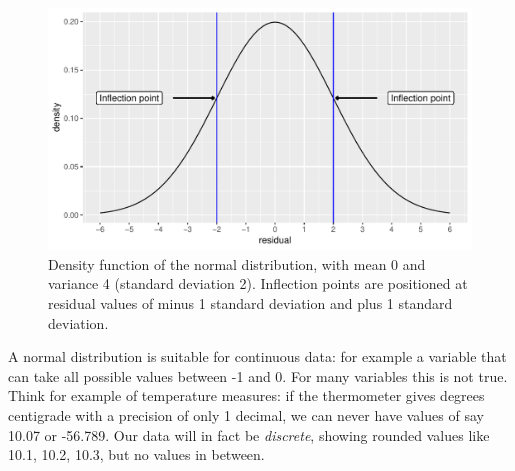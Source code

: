 \documentclass[]{report}\usepackage[]{graphicx}\usepackage[]{color}
\makeatletter
\def\maxwidth{ %
  \ifdim\Gin@nat@width>\linewidth
    \linewidth
  \else
    \Gin@nat@width
  \fi
}
\newenvironment{knitrout}{}{} %
\makeatother
\begin{document}
\begin{knitrout}
\color{fgcolor}\begin{figure}

{\centering \includegraphics[width=\maxwidth]{figure/gen_1-1} 

}

\caption[Density function of the normal distribution, with mean 0 and variance 4 (standard deviation 2)]{Density function of the normal distribution, with mean 0 and variance 4 (standard deviation 2). Inflection points are positioned at residual values of minus 1 standard deviation and plus 1 standard deviation.}\label{fig:gen_1}
\end{figure}


\end{knitrout}
% 
A normal distribution is suitable for continuous data: for example a variable that can take all possible values between -1 and 0. For many variables this is not true. Think for example of temperature measures: if the thermometer gives degrees centigrade with a precision of only 1 decimal, we can never have values of say 10.07 or -56.789. Our data will in fact be \textit{discrete}, showing rounded values like 10.1, 10.2, 10.3, but no values in between.
\end{document}
